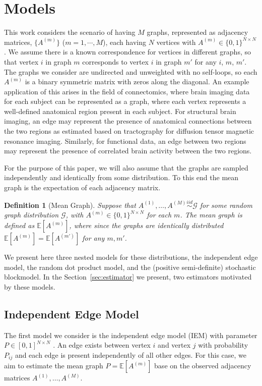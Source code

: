 \documentclass[10pt,letterpaper]{article}
\newtheorem{definition}[fact]{Definition}
\newcommand{\Ex}{\mathbb{E}}
\begin{document}



\section{Models}
\label{section:model_estimator}
This work considers the scenario of having $M$ graphs, represented as adjacency matrices, $\{A^{(m)}\}$ ($m = 1, \cdots, M$), each having $N$ vertices with $A^{(m)}\in\{0,1\}^{N\times N}$.
We assume there is a known correspondence for vertices in different graphs, so that vertex $i$ in graph $m$ corresponds to vertex $i$ in graph $m'$ for any $i$, $m$, $m'$.
The graphs we consider are undirected and unweighted with no self-loops, so each $A^{(m)}$ is a binary symmetric matrix with zeros along the diagonal. An example application of this arises in the field of connectomics, where  brain imaging data for each subject can be represented as a graph, where each vertex represents a well-defined anatomical region present in each subject.
For structural brain imaging, an edge may represent the presence of anatomical connections between the two regions as estimated based on  tractography for diffusion tensor magnetic resonance imaging.
Similarly, for functional data, an edge between two regions may represent the presence of correlated brain activity between the two regions. 


For the purpose of this paper, we will also assume that the graphs are sampled independently and identically from some distribution.
To this end the mean graph is the expectation of each adjacency matrix.
\begin{definition}[Mean Graph]
Suppose that $A^{(1)},\dotsc,A^{(M)}\stackrel{iid}{\sim} \mathcal{G}$ for some random graph distribution $\mathcal{G}$, with $A^{(m)}\in\{0,1\}^{N\times N}$ for each $m$.
The {\em mean graph} is defined as $\Ex[A^{(m)}]$, where since the graphs are identically distributed $\Ex[A^{(m)}]=\Ex[A^{(m')}]$ for any $m,m'$.
\end{definition}

We present here three nested models for these distributions, the independent edge model, the random dot product model, and the (positive semi-definite) stochastic blockmodel.
In the Section~\ref{sec:estimator} we present, two estimators motivated by these models.



\subsection{Independent Edge Model}
The first model we consider is the independent edge model (IEM) with parameter $P \in [0,1]^{N\times N}$ \citep{bollobas2007phase}.
An edge exists between vertex $i$ and vertex $j$ with probability $P_{ij}$ and each edge is present independently of all other edges. 
For this case, we aim to estimate the mean graph $P=\Ex[A^{(m)}]$ base on the observed adjacency matrices $A^{(1)},\dotsc,A^{(M)}$.
\end{document}
